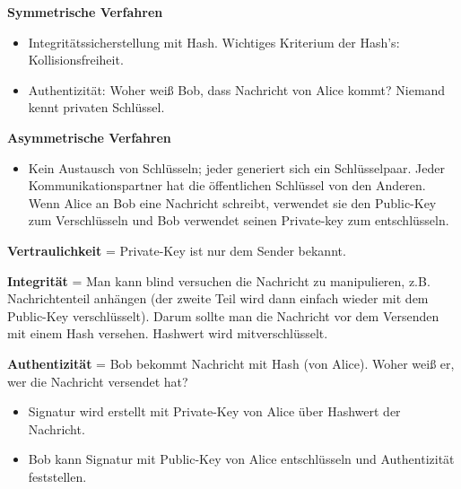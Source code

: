 \documentclass[11pt]{article}
\begin{document}
\textbf{Symmetrische Verfahren}
\begin{itemize}
\item Integritätssicherstellung mit Hash. Wichtiges Kriterium der Hash's: Kollisionsfreiheit.
\item Authentizität: Woher weiß Bob, dass Nachricht von Alice kommt? Niemand kennt privaten Schlüssel.
\end{itemize}

\textbf{Asymmetrische Verfahren}
\begin{itemize}
\item Kein Austausch von Schlüsseln; jeder generiert sich ein Schlüsselpaar. Jeder Kommunikationspartner hat die öffentlichen Schlüssel von den Anderen. Wenn Alice an Bob eine Nachricht schreibt, verwendet sie den Public-Key zum Verschlüsseln und Bob verwendet seinen Private-key zum entschlüsseln.
\end{itemize}

\textbf{Vertraulichkeit} = Private-Key ist nur dem Sender bekannt.

\textbf{Integrität} = Man kann blind versuchen die Nachricht zu manipulieren, z.B. Nachrichtenteil anhängen (der zweite Teil wird dann einfach wieder mit dem Public-Key verschlüsselt). Darum sollte man die Nachricht vor dem Versenden mit einem Hash versehen. Hashwert wird mitverschlüsselt.

\textbf{Authentizität} = Bob bekommt Nachricht mit Hash (von Alice). Woher weiß er, wer die Nachricht versendet hat?
\begin{itemize}
\item Signatur wird erstellt mit Private-Key von Alice über Hashwert der Nachricht.
\item Bob kann Signatur mit Public-Key von Alice entschlüsseln und Authentizität feststellen.
\end{itemize}
\end{document}
